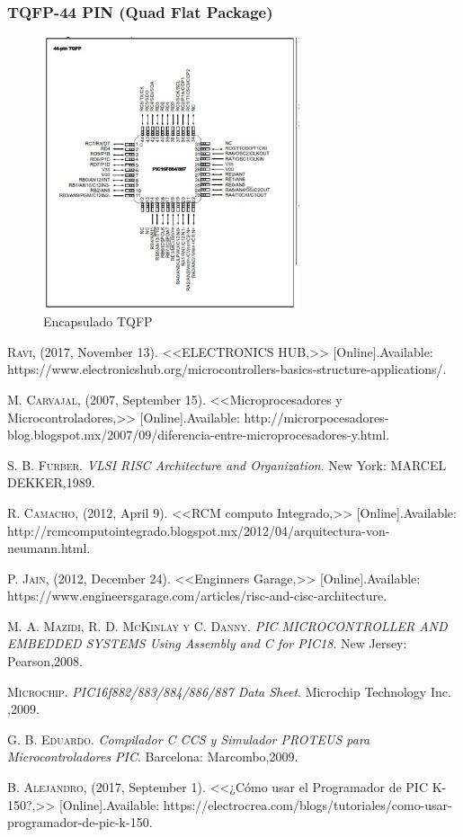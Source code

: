 \documentclass[12pt,a4paper]{article}
\begin{document}
   \subsubsection{TQFP-44 PIN (Quad Flat Package)}
   \begin{figure}[htpb]
   \centering
   \includegraphics[height=8cm]{TQFP_2}
   \caption{Encapsulado TQFP}
   \label{fig:TQFP_2}
   \end{figure}
   \newpage
   \begin{thebibliography}{10}
     \textsc{Ravi}, (2017, November 13). <<ELECTRONICS HUB,>> [Online].Available: https://www.electronicshub.org/microcontrollers-basics-structure-applications/.
     
     \textsc{M. Carvajal}, (2007, September 15). <<Microprocesadores y Microcontroladores,>> [Online].Available: http://microrpocesadores-blog.blogspot.mx/2007/09/diferencia-entre-microprocesadores-y.html.
     
     \textsc{S. B. Furber}. \textit{VLSI RISC Architecture and Organization}. New York: MARCEL DEKKER,1989.
     
     \textsc{R. Camacho}, (2012, April 9). <<RCM computo Integrado,>> [Online].Available: http://rcmcomputointegrado.blogspot.mx/2012/04/arquitectura-von-neumann.html.
     
     \textsc{P. Jain}, (2012, December 24). <<Enginners Garage,>> [Online].Available: https://www.engineersgarage.com/articles/risc-and-cisc-architecture.
     
      \textsc{M. A. Mazidi, R. D. McKinlay y C. Danny}. \textit{PIC MICROCONTROLLER AND EMBEDDED SYSTEMS Using Assembly and C for PIC18}. New Jersey: Pearson,2008.
      
      \textsc{Microchip}. \textit{PIC16f882/883/884/886/887 Data Sheet}. Microchip Technology Inc. ,2009.
      
      \textsc{G. B. Eduardo}. \textit{Compilador C CCS y Simulador PROTEUS para Microcontroladores PIC}. Barcelona: Marcombo,2009.
      
       \textsc{B. Alejandro}, (2017, September 1). <<¿Cómo usar el Programador de PIC K-150?,>> [Online].Available: https://electrocrea.com/blogs/tutoriales/como-usar-programador-de-pic-k-150.
      
    \end{thebibliography}
\end{document}
